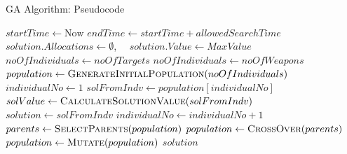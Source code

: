 \documentclass[aspectratio=43,8pt]{beamer}
\begin{document}
\begin{frame}[fragile]{GA Algorithm: Pseudocode}
\begin{algorithm}[H]
\caption{Genetic Algorithm}
\begin{algorithmic}[1]
\State $startTime \gets \text{Now}$
\State $endTime \gets startTime + allowedSearchTime$
\State $solution.Allocations \gets \emptyset$, \ \ $solution.Value \gets MaxValue$
    \State $noOfIndividuals \gets noOfTargets$
\Else
    \State $noOfIndividuals \gets noOfWeapons$
\EndIf
\State $population \gets \Call{GenerateInitialPopulation}{noOfIndividuals}$
    \State $individualNo \gets 1$
        \State $solFromIndv \gets population[individualNo]$
        \State $solValue \gets \Call{CalculateSolutionValue}{solFromIndv}$
            \State $solution \gets solFromIndv$
        \EndIf
        \State $individualNo \gets individualNo + 1$
    \EndWhile
    \State $parents \gets \Call{SelectParents}{population}$
    \State $population \gets \Call{CrossOver}{parents}$
    \State $population \gets \Call{Mutate}{population}$
\EndWhile
\State \Return $solution$
\end{algorithmic}
\end{algorithm}
\end{frame}
\end{document}
